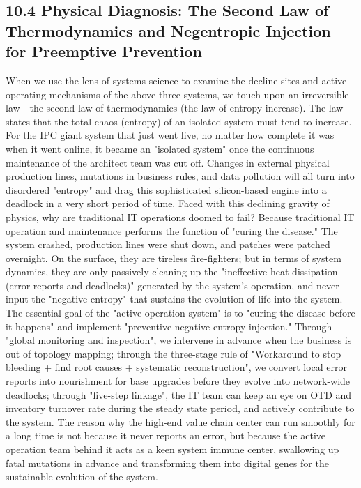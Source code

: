 \documentclass[11pt,a4paper]{article}
\begin{document}
\subsection*{10.4 Physical Diagnosis: The Second Law of Thermodynamics and Negentropic Injection for Preemptive Prevention}


When we use the lens of systems science to examine the decline sites and active operating mechanisms of the above three systems, we touch upon an irreversible law - the second law of thermodynamics (the law of entropy increase). The law states that the total chaos (entropy) of an isolated system must tend to increase. For the IPC giant system that just went live, no matter how complete it was when it went online, it became an "isolated system" once the continuous maintenance of the architect team was cut off. Changes in external physical production lines, mutations in business rules, and data pollution will all turn into disordered "entropy" and drag this sophisticated silicon-based engine into a deadlock in a very short period of time. Faced with this declining gravity of physics, why are traditional IT operations doomed to fail? Because traditional IT operation and maintenance performs the function of "curing the disease." The system crashed, production lines were shut down, and patches were patched overnight. On the surface, they are tireless fire-fighters; but in terms of system dynamics, they are only passively cleaning up the "ineffective heat dissipation (error reports and deadlocks)" generated by the system's operation, and never input the "negative entropy" that sustains the evolution of life into the system. The essential goal of the "active operation system" is to "curing the disease before it happens" and implement "preventive negative entropy injection." Through "global monitoring and inspection", we intervene in advance when the business is out of topology mapping; through the three-stage rule of "Workaround to stop bleeding + find root causes + systematic reconstruction", we convert local error reports into nourishment for base upgrades before they evolve into network-wide deadlocks; through "five-step linkage", the IT team can keep an eye on OTD and inventory turnover rate during the steady state period, and actively contribute to the system. The reason why the high-end value chain center can run smoothly for a long time is not because it never reports an error, but because the active operation team behind it acts as a keen system immune center, swallowing up fatal mutations in advance and transforming them into digital genes for the sustainable evolution of the system.
\end{document}
